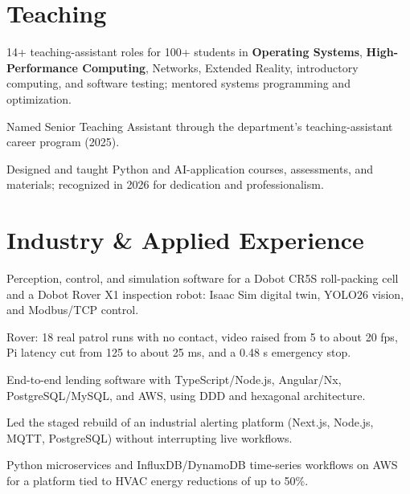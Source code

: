 \documentclass[letterpaper,10pt]{article}
\begin{document}
\section{Teaching}
\begin{points}
  \item 14+ teaching-assistant roles for 100+ students in \textbf{Operating Systems}, \textbf{High-Performance Computing}, Networks, Extended Reality, introductory computing, and software testing; mentored systems programming and optimization.
  \item Named Senior Teaching Assistant through the department's teaching-assistant career program (2025).
\end{points}
\begin{points}
  \item Designed and taught Python and AI-application courses, assessments, and materials; recognized in 2026 for dedication and professionalism.
\end{points}

\section{Industry \& Applied Experience}
\begin{points}
  \item Perception, control, and simulation software for a Dobot CR5S roll-packing cell and a Dobot Rover X1 inspection robot: Isaac Sim digital twin, YOLO26 vision, and Modbus/TCP control.
  \item Rover: 18 real patrol runs with no contact, video raised from 5 to about 20 fps, Pi latency cut from 125 to about 25 ms, and a 0.48 s emergency stop.
\end{points}
\begin{points}
  \item End-to-end lending software with TypeScript/Node.js, Angular/Nx, PostgreSQL/MySQL, and AWS, using DDD and hexagonal architecture.
\end{points}
\begin{points}
  \item Led the staged rebuild of an industrial alerting platform (Next.js, Node.js, MQTT, PostgreSQL) without interrupting live workflows.
\end{points}
\begin{points}
  \item Python microservices and InfluxDB/DynamoDB time-series workflows on AWS for a platform tied to HVAC energy reductions of up to 50\%.
\end{points}
\end{document}
